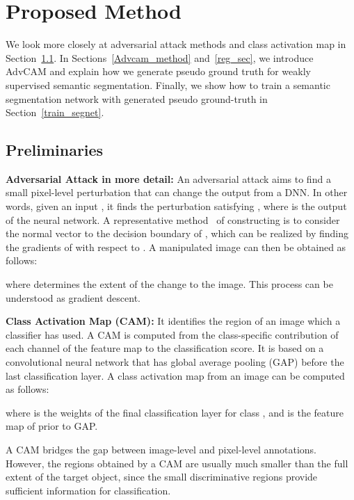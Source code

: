 \documentclass[final]{cvpr}
\begin{document}
\section{Proposed Method}
We look more closely at adversarial attack methods and class activation map in Section~\ref{adv_attack_method}.
In Sections~\ref{Advcam_method} and~\ref{reg_sec}, we introduce AdvCAM and explain how we generate pseudo ground truth for weakly supervised semantic segmentation. Finally, we show how to train a semantic segmentation network with generated pseudo ground-truth in Section~\ref{train_segnet}. 



\subsection{Preliminaries}\label{adv_attack_method}
\noindent\textbf{Adversarial Attack in more detail:} An adversarial attack aims to find a small pixel-level perturbation that can change the output from a DNN.
In other words, given an input , it finds the perturbation  satisfying , where  is the output of the neural network.
A representative method~\cite{goodfellow2014explaining} of constructing  is to consider the normal vector to the decision boundary of , which can be realized by finding the gradients of  with respect to . 
A manipulated image  can then be obtained as follows:
\vspace{-0.2em}

where  determines the extent of the change to the image. This process can be understood as gradient descent.



\noindent\textbf{Class Activation Map (CAM):}
It identifies the region of an image which a classifier has used.
A CAM is computed from the class-specific contribution of each channel of the feature map to the classification score. It is based on a convolutional neural network that has global average pooling (GAP) before the last classification layer. 
A class activation map  from an image  can be computed as follows:
\vspace{-0.4em}

where  is the weights of the final classification layer for class , and  is the feature map of  prior to GAP.



A CAM bridges the gap between image-level and pixel-level annotations. However, the regions obtained by a CAM are usually much smaller than the full extent of the target object, since the small discriminative regions provide sufficient information for classification.
\end{document}
